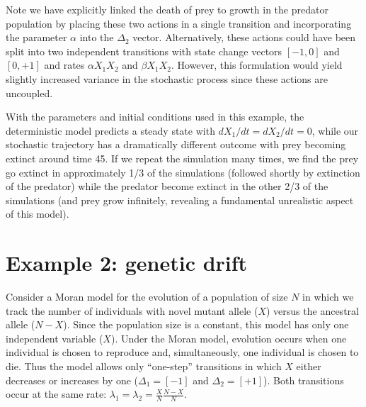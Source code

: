 \documentclass[11pt,nogin]{article}
\begin{document}
Note we have explicitly linked the death of prey to growth in the predator population by placing these two actions in a single transition and incorporating the parameter $\alpha$ into the $\Delta_{2}$ vector. Alternatively, these actions could have been split into two independent transitions with state change vectors $[-1,0]$ and $[0,+1]$ and rates $\alpha X_{1}X_{2}$ and $\beta X_{1}X_{2}$. However, this formulation would yield slightly increased variance in the stochastic process since these actions are uncoupled.

With the parameters and initial conditions used in this example, the deterministic model predicts a steady state with $dX_{1}/dt=dX_{2}/dt=0$, while our stochastic trajectory has a dramatically different outcome with prey becoming extinct around time 45. If we repeat the simulation many times, we find the prey go extinct in approximately 1/3 of the simulations (followed shortly by extinction of the predator) while the predator become extinct in the other 2/3 of the simulations
(and prey grow infinitely, revealing a fundamental unrealistic aspect of this model).


\section*{Example 2: genetic drift}
Consider a Moran model for the evolution of a population of size $N$ in which we track the number of individuals with novel mutant allele ($X$) versus the ancestral allele ($N-X$).  Since the population size is a constant, this model has only one independent variable ($X$).  Under the Moran model, evolution occurs when one individual is chosen to reproduce and, simultaneously, one individual is chosen to die.  Thus the model allows only ``one-step'' transitions in which $X$ either decreases or increases by one ($\Delta_1=[-1]$ and $\Delta_2=[+1]$).  Both transitions occur at the same rate: $\lambda_1 = \lambda_2 = \frac{X}{N}\frac{N-X}{N}$.
\end{document}
